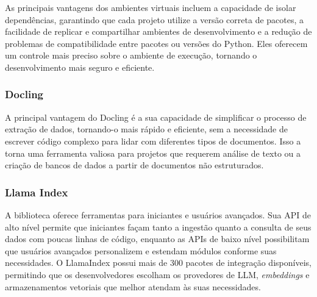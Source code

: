 \documentclass[a4paper, 12pt]{article}
\begin{document}
    As principais vantagens dos ambientes virtuais incluem a capacidade de isolar dependências, garantindo que cada projeto utilize a versão correta de pacotes, a facilidade de replicar e compartilhar ambientes de desenvolvimento e a redução de problemas de compatibilidade entre pacotes ou versões do Python. Eles oferecem um controle mais preciso sobre o ambiente de execução, tornando o desenvolvimento mais seguro e eficiente.

    \subsubsection{Docling} \label{sec:docling}


    A principal vantagem do Docling é a sua capacidade de simplificar o processo de extração de dados, tornando-o mais rápido e eficiente, sem a necessidade de escrever código complexo para lidar com diferentes tipos de documentos. Isso a torna uma ferramenta valiosa para projetos que requerem análise de texto ou a criação de bancos de dados a partir de documentos não estruturados.

    \subsubsection{Llama Index} \label{sec:llama_index}


    A biblioteca oferece ferramentas para iniciantes e usuários avançados. Sua API de alto nível permite que iniciantes façam tanto a ingestão quanto a consulta de seus dados com poucas linhas de código, enquanto as APIs de baixo nível possibilitam que usuários avançados personalizem e estendam módulos conforme suas necessidades. O LlamaIndex possui mais de 300 pacotes de integração disponíveis, permitindo que os desenvolvedores escolham os provedores de LLM, \textit{embeddings} e armazenamentos vetoriais que melhor atendam às suas necessidades.
\end{document}
